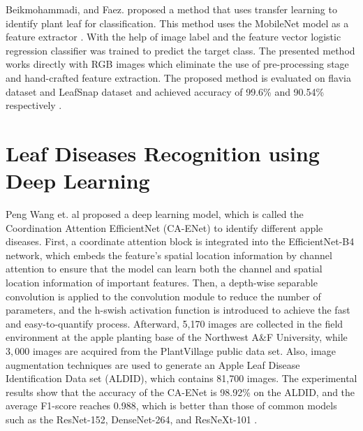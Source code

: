 Beikmohammadi, and Faez. proposed a method that uses transfer learning 
to identify plant leaf for classification. This method uses the MobileNet 
model as a feature extractor . With the help of image label and the feature 
vector logistic regression classifier was trained to predict the target class. 
The presented method works directly with RGB images which eliminate the use of 
pre-processing stage and hand-crafted feature extraction. The proposed method 
is evaluated on flavia dataset and LeafSnap dataset and achieved accuracy of 
99.6\% and 90.54\% respectively \cite{bei18}.


\section{Leaf Diseases Recognition using Deep Learning}

Peng Wang et. al proposed a deep 
learning model, which is called the Coordination Attention EfficientNet 
(CA-ENet) to identify different apple diseases. First, a 
coordinate attention block is integrated into the EfficientNet-B4 network, 
which embeds the feature's spatial location information by channel attention 
to ensure that the model can learn both the channel and spatial location 
information of important features. Then, a depth-wise separable convolution 
is applied to the convolution module to reduce the number of parameters, and 
the h-swish activation function is introduced to achieve the fast and 
easy-to-quantify process. Afterward, 5,170 images are collected in the 
field environment at the apple planting base of the Northwest A\&F University,
while $3,000$ images are acquired from the PlantVillage public data set. 
Also, image augmentation techniques are used to generate an Apple Leaf Disease 
Identification Data set (ALDID), which contains 81,700 images. The experimental 
results show that the accuracy of the CA-ENet is 98.92\% on the ALDID, and the 
average F1-score reaches 0.988, which is better than those of common models such 
as the ResNet-152, DenseNet-264, and ResNeXt-101 \cite{wan21}. \\

